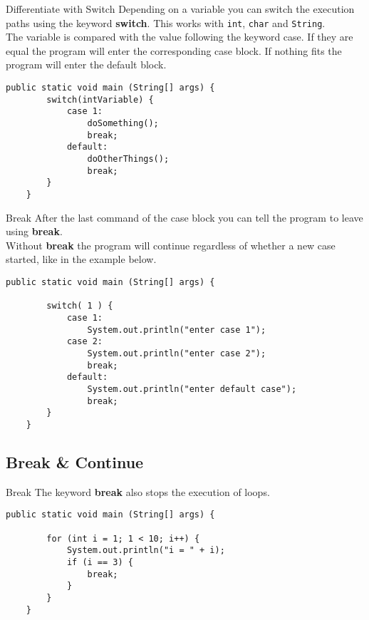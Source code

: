 \begin{frame}[fragile]{Differentiate with Switch}
    Depending on a variable you can switch the execution paths using the keyword \textbf{switch}.
    This works with \texttt{int}, \texttt{char} and \texttt{String}. \\
    \vfill
    The variable is compared 
    with the value following the keyword case.
    If they are equal the program will enter the corresponding case block.
    If nothing fits the program will enter the default block.
    \begin{lstlisting}[basicstyle=\ttfamily\scriptsize]
    public static void main (String[] args) {
        switch(intVariable) {
            case 1:
                doSomething();
                break;
            default:
                doOtherThings();
                break;
        }
    }
    \end{lstlisting}
\end{frame}
\begin{frame}[fragile]{Break}
    After the last command of the case block    you can tell the program to leave using \textbf{break}.\\
    Without \textbf{break} the program will continue regardless of
    whether a new case started, like in the example below.
    \begin{lstlisting}[basicstyle=\ttfamily\scriptsize]
    public static void main (String[] args) {
    
        switch( 1 ) {
            case 1:
                System.out.println("enter case 1");
            case 2:
                System.out.println("enter case 2");
                break;
            default:
                System.out.println("enter default case");
                break;
        }
    }
    \end{lstlisting}
\end{frame}

\subsection{Break \& Continue}
\begin{frame}[fragile]{Break}
    The keyword \textbf{break} also stops the execution of loops.
    \begin{lstlisting}[basicstyle=\ttfamily\scriptsize]
    public static void main (String[] args) {
    
        for (int i = 1; 1 < 10; i++) {
            System.out.println("i = " + i);
            if (i == 3) {
                break;
            }
        }
    }
    \end{lstlisting}
\end{frame}

